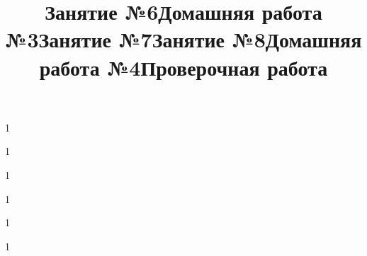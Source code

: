 \newpage
\title{Занятие №6}
\begin{listofex}
	\item 1
	
\end{listofex}
\newpage
\title{Домашняя работа №3}
\begin{listofex}
	\item 1
	
\end{listofex}
\newpage
\title{Занятие №7}
\begin{listofex}
	\item 1
	
\end{listofex}
\newpage
\title{Занятие №8}
\begin{listofex}
	\item 1
	
\end{listofex}
\newpage
\title{Домашняя работа №4}
\begin{listofex}
	\item 1
	
\end{listofex}
\newpage
\title{Проверочная работа}
\begin{listofex}
	\item 1
	
\end{listofex}